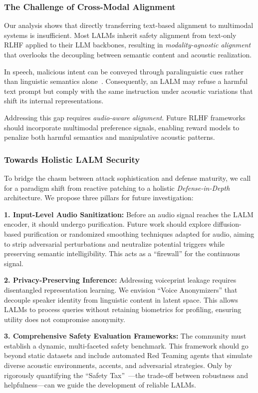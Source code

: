 \subsubsection{The Challenge of Cross-Modal Alignment}

Our analysis shows that directly transferring text-based alignment to multimodal systems is insufficient. Most LALMs inherit safety alignment from text-only RLHF applied to their LLM backbones, resulting in \textit{modality-agnostic alignment} that overlooks the decoupling between semantic content and acoustic realization.

In speech, malicious intent can be conveyed through paralinguistic cues rather than linguistic semantics alone~\cite{lin2025hidden}. Consequently, an LALM may refuse a harmful text prompt but comply with the same instruction under acoustic variations that shift its internal representations.

Addressing this gap requires \textit{audio-aware alignment}. Future RLHF frameworks should incorporate multimodal preference signals, enabling reward models to penalize both harmful semantics and manipulative acoustic patterns.

\subsubsection{Towards Holistic LALM Security}

To bridge the chasm between attack sophistication and defense maturity, we call for a paradigm shift from reactive patching to a holistic \textit{Defense-in-Depth} architecture. We propose three pillars for future investigation:

\textbf{1. Input-Level Audio Sanitization:} Before an audio signal reaches the LALM encoder, it should undergo purification. Future work should explore diffusion-based purification or randomized smoothing techniques adapted for audio, aiming to strip adversarial perturbations and neutralize potential triggers while preserving semantic intelligibility. This acts as a ``firewall'' for the continuous signal.

\textbf{2. Privacy-Preserving Inference:} Addressing voiceprint leakage requires disentangled representation learning. We envision ``Voice Anonymizers'' that decouple speaker identity from linguistic content in latent space. This allows LALMs to process queries without retaining biometrics for profiling, ensuring utility does not compromise anonymity.

\textbf{3. Comprehensive Safety Evaluation Frameworks:} The community must establish a dynamic, multi-faceted safety benchmark. This framework should go beyond static datasets and include automated Red Teaming agents that simulate diverse acoustic environments, accents, and adversarial strategies. Only by rigorously quantifying the ``Safety Tax''~\cite{huang2025safety}—the trade-off between robustness and helpfulness—can we guide the development of reliable LALMs.



